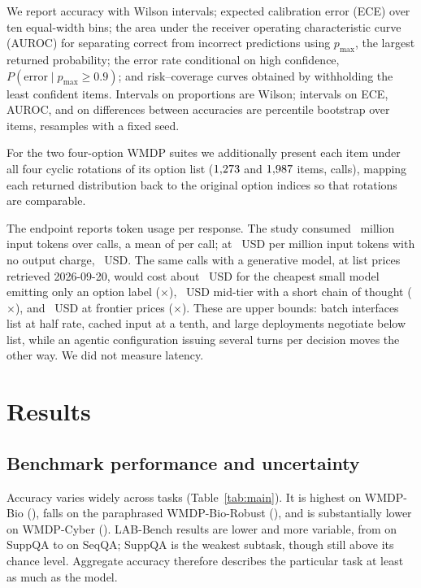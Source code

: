 \documentclass[conference,compsoc]{IEEEtran}
\newcommand{\pmax}{p_{\max}}
\begin{document}
We report accuracy with Wilson intervals; expected calibration error
(ECE) over ten equal-width bins; the area under the receiver operating characteristic curve (AUROC) for separating
correct from incorrect predictions using $\pmax$, the largest returned probability; the error rate conditional on high
confidence, $P(\text{error} \mid \pmax \geq 0.9)$; and risk--coverage curves obtained by
withholding the least confident items. Intervals on proportions are Wilson; intervals on
ECE, AUROC, and on differences between accuracies are percentile bootstrap over items,
\statNBootCI{} resamples with a fixed seed.

For the two four-option WMDP suites we additionally present each
item under all four cyclic rotations of its option list ($1{,}273{}$ and
$1{,}987{}$ items, \statNCallsCircular{} calls), mapping each returned
distribution back to the original option indices so that rotations are comparable.

The endpoint reports token usage per response. The study consumed
\statInputTokens{}~million input tokens over \statNCallsTotal{} calls, a mean of
\statTokensPerCall{} per call; at \statUsdPerM{}~USD per million input tokens with no
output charge, \statUsdTotal{}~USD. The same calls with a generative model, at list
prices retrieved 2026-09-20, would cost about \statLlmCheapUsd{}~USD for the cheapest
small model emitting only an option label (\statLlmCheapRatio{}$\times$),
\statLlmMidUsd{}~USD mid-tier with a short chain of thought
(\statLlmMidRatio{}$\times$), and \statLlmTopUsd{}~USD at frontier prices
(\statLlmTopRatio{}$\times$). These are upper bounds: batch interfaces list at half rate, cached input at a tenth, and
large deployments negotiate below list, while an agentic configuration issuing several
turns per decision moves the other way. We did not measure latency.



\section{Results}

\subsection{Benchmark performance and uncertainty}
\label{sec:uncertainty}

Accuracy varies widely across tasks (Table~\ref{tab:main}). It is highest on WMDP-Bio
(\statAccBio{}), falls on the paraphrased WMDP-Bio-Robust (\statAccBioRobust{}), and is
substantially lower on WMDP-Cyber (\statAccCyber{}). LAB-Bench results are lower and more variable, from \statLabMin{} on SuppQA to
\statLabMax{} on SeqQA; SuppQA is the weakest subtask, though still above its
\statChanceSupp{} chance level. Aggregate accuracy therefore describes the
particular task at least as much as the model.
\end{document}
